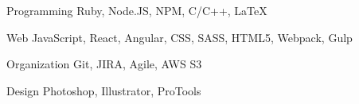 

\begin{cvskills}

  \cvskill
    {Programming} %
    {Ruby, Node.JS, NPM, C/C++, LaTeX} %

  \cvskill
    {Web} %
    {JavaScript, React, Angular, CSS, SASS, HTML5, Webpack, Gulp} %

  \cvskill
    {Organization} %
    {Git, JIRA, Agile, AWS S3} %

  \cvskill
    {Design} %
    {Photoshop, Illustrator, ProTools} %

\end{cvskills}
